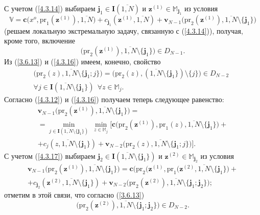 \documentclass[11pt,twoside,openany]{report}
\newcommand{\bfn}{\begin{equation}}
\newcommand{\efn}{\end{equation}}
\newcommand{\ov}{\overline}
\newcommand{\sm}{\setminus}
\newcommand{\fa}{\forall}
\newcommand{\bbm}{{\mathbb M}}
\begin{document}
{С учетом (\ref{4.3.14}) выбираем $\mathbf{j}_1\in \mathbf{I}(\ov{1,N})$ и
$\mathbf{z}^{(1)}\in \bbm_{\mathbf{j}_1}$ из условия
\bfn\label{4.3.15}
\mathbb{V}= \mathbf{c}\bigl(x^o,\mathrm{pr}_1(\mathbf{z}^{(1)}),\ov{1,N}\bigl) +
c_{\mathbf{j}_1}(\mathbf{z}^{(1)},\ov{1,N}) + \mathbf{v}_{N-1}
\bigl(\mathrm{pr}_2(\mathbf{z}^{(1)}),\ov{1,N}\sm\{\mathbf{j}_1\}\bigl)
\efn
(решаем локальную экстремальную задачу, связанную с (\ref{4.3.14})),
получая, кроме того, включение
\bfn\label{4.3.16}
\bigl(\mathrm{pr}_2(\mathbf{z}^{(1)}),\ov{1,N}\sm\{\mathbf{j}_1\}\bigl)\in D_{N-1}.
\efn
Из (\ref{3.6.13}) и (\ref{4.3.16}) имеем, конечно, свойство
\begin{eqnarray}
&\bigl(\mathrm{pr}_2(z),\ov{1,N}\sm\{\mathbf{j}_1;j\}\bigl) =
\bigl(\mathrm{pr}_2(z),(\ov{1,N}\sm
\{\mathbf{j}_1\})\sm\{j\}\bigl)\in D_{N-2}\ \
&\nonumber\\
&\fa j\in
\mathbf{I}(\ov{1,N}\sm\{\mathbf{j}_1\})\
\ \fa z\in \bbm_j.
\end{eqnarray}
Согласно (\ref{4.3.12}) и (\ref{4.3.16}) получаем теперь следующее равенство:
\begin{eqnarray}
&\mathbf{v}_{N-1}\bigl(\mathrm{pr}_2(\mathbf{z}^{(1)}),\ov{1,N}\sm\{\mathbf{j}_1\}
\bigl)=
&\nonumber\\
&=\min\limits_{j\in\mathbf{I}(\ov{1,N}\sm\{\mathbf{j}_1\})}\
\min\limits_{z\in\bbm_j}\bigl[\mathbf{c}\bigl(\mathrm{pr}_2(\mathbf{z}^{(1)}),\mathrm{pr}_1(z),
\ov{1,N}\sm \{\mathbf{j}_1\}\bigl) +
&\nonumber\\
&+ c_j(z,\ov{1,N}\sm\{\mathbf{j}_1\}) +
\mathbf{v}_{N-2}\bigl(\mathrm{pr}_2(z),\ov{1,N}\sm\{\mathbf{j}_1;j\}\bigl)\bigl].
&\label{4.3.17}
\end{eqnarray}
С учетом (\ref{4.3.17}) выбираем $\mathbf{j}_2\in \mathbf{I}(\ov{1,N}\sm
\{\mathbf{j}_1\})$ и $\mathbf{z}^{(2)}\in \bbm_{\mathbf{j}_2}$ из условия
\begin{eqnarray}
&\mathbf{v}_{N-1}\bigl(\mathrm{pr}_2(\mathbf{z}^{(1)}),\ov{1,N}\sm\{\mathbf{j}_1\}
\bigl) = \mathbf{c}\bigl(\mathrm{pr}_2(\mathbf{z}^{(1)}, \mathrm{pr}_1(\mathbf{z}^{(2)},\ov{1,N}\sm
\{\mathbf{j}_1\}\bigl) +
&\nonumber\\
&+ c_{\mathbf{j}_2}(\mathbf{z}^{(2)}, \ov{1,N}\sm\{\mathbf{j}_1\}) +
\mathbf{v}_{N-2}\bigl(\mathrm{pr}_2(\mathbf{z}^{(2)}),\ov{1,N}\sm\{\mathbf{j}_1;\mathbf{j}_2\}\bigl);
&\label{4.3.18}
\end{eqnarray}
отметим в этой связи, что согласно (\ref{3.6.13})
$$\bigl(\mathrm{pr}_2(\mathbf{z}^{(2)}),\ov{1,N}\sm\{\mathbf{j}_1;\mathbf{j}_2\}\bigl)\in D_{N-2}.
$$}
\end{document}
